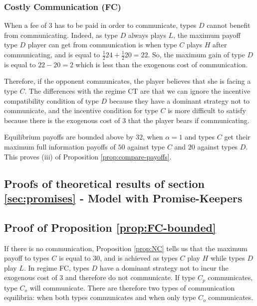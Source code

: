 \documentclass[12pt]{article}
\theoremstyle{break}
\begin{document}
\subsubsection*{Costly Communication (FC)}
When a fee of $3$ has to be paid in order to communicate, types $D$ cannot benefit from communicating. Indeed, as type $D$ always plays $L$, the maximum payoff type $D$ player can get from communication is when type $C$ plays $H$ after communicating, and is equal to $\frac{1}{2}24 +\frac{1}{2}20=22$. So, the maximum gain of type $D$ is equal to $22-20=2$ which is less than the exogenous cost of communication.

Therefore, if the opponent communicates, the player believes that she is facing a type $C$. The differences with the regime CT are that we can ignore the incentive compatibility condition of type $D$ because they have a dominant strategy not to communicate, and the incentive condition for type $C$ is more difficult to satisfy because there is the exogenous cost of $3$ that the player bears if communicating.  


Equilibrium payoffs are bounded above by $32$, when $\alpha=1$ and types $C$ get their maximum full information payoffs of $50$ against type $C$ and $20$ against types $D$. This proves (iii) of Proposition \ref{prop:compare-payoffs}.

%   
%    
\subsection{Proofs of theoretical results of section \ref{sec:promises}  - Model with Promise-Keepers}

\subsection*{Proof of Proposition \ref{prop:FC-bounded}}

	If there is no communication, Proposition \ref{prop:NC} tells us that the maximum payoff to types $C$ is equal to $30$, and is achieved as types $C$ play $H$ while types $D$ play $L$. In regime FC, types $D$ have a dominant strategy not to incur the exogenous cost of $3$ and therefore do not communicate. If type $C_p$ communicates, type $C_o$ will communicate. There are therefore two types of communication equilibria: when both types communicates and when only type $C_o$ communicates. 
	
\end{document}
